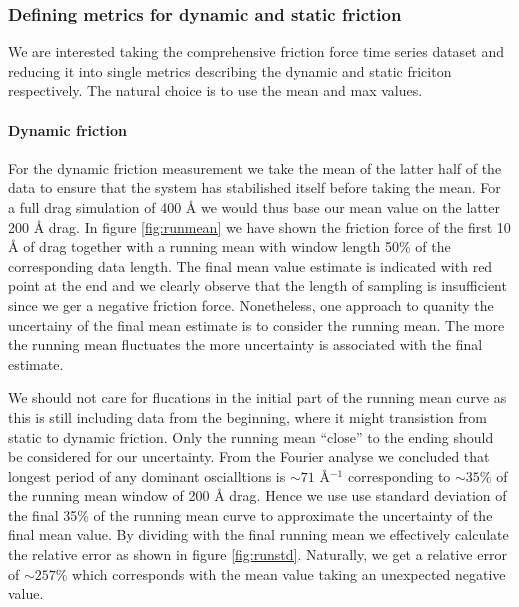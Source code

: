 \subsubsection{Defining metrics for dynamic and static friction}
We are interested taking the comprehensive friction force time series dataset
and reducing it into single metrics describing the dynamic and static friciton
respectively. The natural choice is to use the mean and max values. 

\paragraph*{Dynamic friction} For the dynamic friction measurement we take the mean of the latter half of the data to ensure that the system has
stabilished itself before taking the mean. For a full drag simulation of 400 Å
we would thus base our mean value on the latter 200 Å drag. In figure
\ref{fig:runmean} we have shown the friction force of the first 10 Å of drag
together with a running mean with window length 50\% of the corresponding data
length. The final mean value estimate is indicated with red point at the end and
we clearly observe that the length of sampling is insufficient since we ger a
negative friction force.  Nonetheless, one approach to quanity the uncertainy of
the final mean estimate is to consider the running mean. The more the running
mean fluctuates the more uncertainty is associated with the final estimate. 


We should not care for flucations in the initial part of the running mean curve
as this is still including data from the beginning, where it might transistion
from static to dynamic friction. Only the running mean ``close'' to the ending
should be considered for our uncertainty. From the Fourier analyse we concluded
that longest period of any dominant oscialltions is $\sim 71$ Å$^{-1}$
corresponding to $\sim 35 \%$ of the running mean window of 200 Å drag. Hence we use use standard deviation of the final 35\% of the running mean curve to approximate the uncertainty of the final mean value. By dividing with the final running mean we effectively calculate the relative error as shown in figure \ref{fig:runstd}. Naturally, we get a relative error of $\sim 257\%$ which corresponds with the mean value taking an unexpected negative value.


